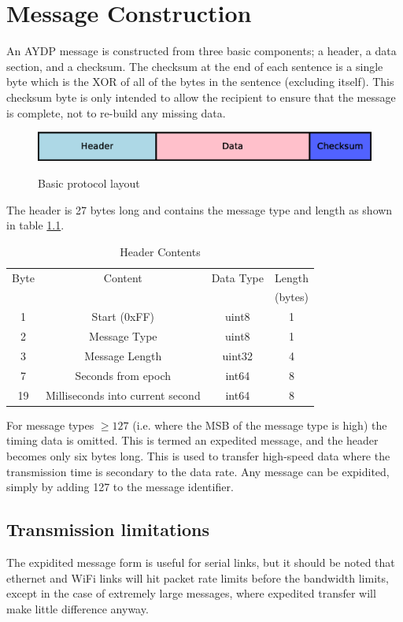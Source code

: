 \chapter{Message Construction}
An AYDP message is constructed from three basic components; a header, a data section, and a checksum. The checksum at the end of each sentence is a single byte which is the XOR of all of the bytes in the sentence (excluding itself). This checksum byte is only intended to allow the recipient to ensure that the message is complete, not to re-build any missing data.

\begin{figure}[H]
  \centering
  \includegraphics[width=1.0\textwidth]{Figures/protocolBasicLayout.eps}
  \label{figure:msg:basicProto}
  \caption{Basic protocol layout}
\end{figure}

The header is 27 bytes long and contains the message type and length as shown in table \ref{table:msg:header}.

\begin{table}[H]
  \centering
  \begin{tabular}{ c c c c }
  Byte &          Content    & Data Type & Length  \\
       &                     &           & (bytes) \\
\hline
   1   &  Start (0xFF)       &   uint8   &    1    \\
   2   &  Message Type       &   uint8   &    1    \\
   3   &  Message Length     &   uint32  &    4    \\
   7   &  Seconds from epoch &   int64   &    8    \\
   19  &  Milliseconds into current second & int64 & 8 \\
  \end{tabular}
  \caption{Header Contents}
  \label{table:msg:header}
\end{table}

For message types $\geq 127$ (i.e. where the MSB of the message type is high) the timing data is omitted. This is termed an expedited message, and the header becomes only six bytes long. This is used to transfer high-speed data where the transmission time is secondary to the data rate. Any message can be expidited, simply by adding 127 to the message identifier.

\section{Transmission limitations}

The expidited message form is useful for serial links, but it should be noted that ethernet and WiFi links will hit packet rate limits before the bandwidth limits, except in the case of extremely large messages, where expedited transfer will make little difference anyway.

